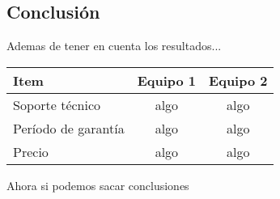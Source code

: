 \subsection{Conclusión}
Ademas de tener en cuenta los resultados...

\begin{center}
\begin{tabular}{|lcc|} \hline
\footnotesize\textbf{Item} & \footnotesize\textbf{Equipo 1} & \footnotesize\textbf{Equipo 2} \\\hline
Soporte técnico & algo & algo \\\hline
Período de garantía & algo & algo \\\hline
Precio & algo & algo \\\hline
\end{tabular}
\end{center}

Ahora si podemos sacar conclusiones